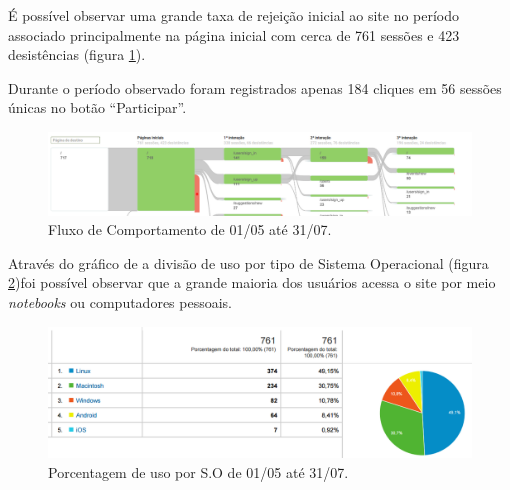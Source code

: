 \par É possível observar uma grande taxa de rejeição inicial ao site no período associado principalmente na página inicial com cerca de 761 sessões e 423 desistências (figura \ref{fig:analytics_1ainteracao_fluxo}).
\par Durante o período observado foram registrados apenas 184 cliques em 56 sessões únicas no botão ``Participar''.
\begin{figure}[htb]
\centering
\includegraphics[width=15cm]{figuras/analytics_1ainteracao_fluxo}
\caption{\label{fig:analytics_1ainteracao_fluxo} Fluxo de Comportamento de 01/05 até 31/07.}
\end{figure}
\par Através do gráfico de a divisão de uso por tipo de Sistema Operacional (figura \ref{fig:analytics_1interacao_so})foi possível observar que a grande maioria dos usuários acessa o site por meio \emph{notebooks} ou computadores pessoais.
\begin{figure}[htb]
\includegraphics[width=15cm]{figuras/analytics_1interacao_so}
\caption{\label{fig:analytics_1interacao_so} Porcentagem de uso por S.O de 01/05 até 31/07.}
\end{figure}
